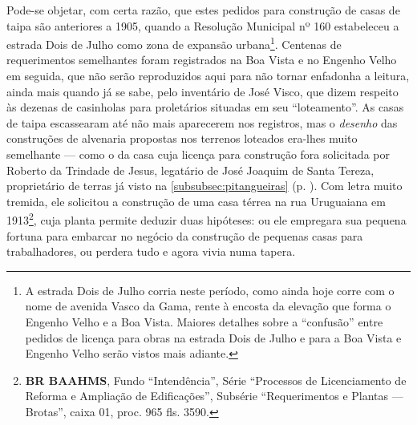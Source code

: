 Pode-se objetar, com certa razão, que estes pedidos para construção de casas de taipa são anteriores a 1905, quando a Resolução Municipal nº 160 estabeleceu a estrada Dois de Julho como zona de expansão urbana\footnote{A estrada Dois de Julho corria neste período, como ainda hoje corre com o nome de avenida Vasco da Gama, rente à encosta da elevação que forma o Engenho Velho e a Boa Vista. Maiores detalhes sobre a ``confusão'' entre pedidos de licença para obras na estrada Dois de Julho e para a Boa Vista e Engenho Velho serão vistos mais adiante.}. Centenas de requerimentos semelhantes foram registrados na Boa Vista e no Engenho Velho em seguida, que não serão reproduzidos aqui para não tornar enfadonha a leitura, ainda mais quando já se sabe, pelo inventário de José Visco, que dizem respeito às dezenas de casinholas para proletários situadas em seu ``loteamento''. As casas de taipa escassearam até não mais aparecerem nos registros, mas o \textit{desenho} das construções de alvenaria propostas nos terrenos loteados era-lhes muito semelhante --- como o da casa cuja licença para construção fora solicitada por Roberto da Trindade de Jesus, legatário de José Joaquim de Santa Tereza, proprietário de terras já visto na \autoref{subsubsec:pitangueiras} (p. \pageref{subsubsec:pitangueiras}). Com letra muito tremida, ele solicitou a construção de uma casa térrea na rua Uruguaiana em 1913\footnote{\textbf{BR BAAHMS}, Fundo ``Intendência'', Série ``Processos de Licenciamento de Reforma e Ampliação de Edificações'', Subsérie ``Requerimentos e Plantas --- Brotas'', caixa 01, proc. 965 fls. 3590.}, cuja planta permite deduzir duas hipóteses: ou ele empregara sua pequena fortuna para embarcar no negócio da construção de pequenas casas para trabalhadores, ou perdera tudo e agora vivia numa tapera.


